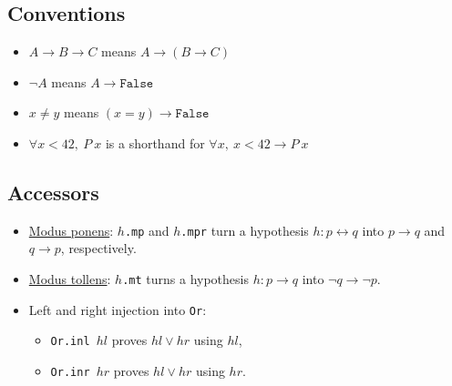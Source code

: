 \documentclass[a4paper]{article}
\newcommand{\False}{\texttt{False}}
\begin{document}

\subsection*{Conventions}

\begin{itemize}
    \item $A \to B \to C$ means $A \to (B \to C)$
    \item $\neg A$ means $A \to \False$
    \item $x \neq y$ means $(x = y) \to \False$
    \item $\forall x < 42,\ P\ x$ is a shorthand for $\forall x,\ x < 42 \to P\ x$
\end{itemize}

\subsection*{Accessors}

\begin{itemize}
    \item \href{https://en.wikipedia.org/wiki/Modus_ponens}{Modus ponens}: \texttt{$h$.mp} and \texttt{$h$.mpr} turn a hypothesis $h : p \leftrightarrow q$ into $p \to q$ and $q \to p$, respectively.
    \item \href{https://en.wikipedia.org/wiki/Modus_tollens}{Modus tollens}: \texttt{$h$.mt} turns a hypothesis $h : p \to q$ into $\neg q \to \neg p$.
    \item Left and right injection into \texttt{Or}:
    \begin{itemize}
        \item \texttt{Or.inl $hl$} proves $hl \vee hr$ using $hl$,
        \item \texttt{Or.inr $hr$} proves $hl \vee hr$ using $hr$.
    \end{itemize}
\end{itemize}
\end{document}

